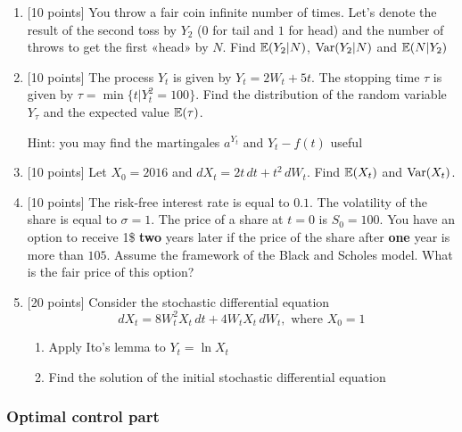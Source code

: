 \documentclass[12pt, a4paper]{article}
\begin{document}
\vspace{10pt}

\begin{enumerate}


\item $[$10 points] You throw a fair coin infinite number of times. 
Let's denote the result of the second toss by $Y_2$ ($0$ for tail and $1$ for head) and the number of throws to get the first «head» by $N$. 
Find $\mathbb{E}(Y_2|N)$, $\operatorname{Var}(Y_2|N)$ and $\mathbb{E}(N|Y_2)$

\item $[$10 points] The process $Y_t$ is given by $Y_t=2W_t+5t$. The stopping time $\tau$ is given by $\tau=\min\{t|Y_t^2=100\}$. Find the distribution of the random variable $Y_\tau$ and the expected value $\mathbb{E}(\tau)$.


Hint: you may find the martingales $a^{Y_t}$ and $Y_t-f(t)$ useful

\item $[$10 points] Let $X_0 = 2016$ and $dX_t = 2t \, dt + t^2 \, dW_t$. Find $\mathbb{E}(X_t)$ and $\operatorname{Var}(X_t)$.

\item $[$10 points] The risk-free interest rate is equal to $0.1$. The volatility of the share is equal to $\sigma=1$. The price of a share at $t=0$ is $S_0=100$. You have an option to receive 1\$ \textbf{two} years later if the price of the share after \textbf{one} year is more than $105$. Assume the framework of the Black and Scholes model. What is the fair price of this option?

\item $[$20 points] Consider the stochastic differential equation
\[
dX_t = 8W^2_t X_t \, dt + 4W_t X_t\, dW_t, \text{ where } X_0 = 1
\]

\begin{enumerate}
\item Apply Ito's lemma to $Y_t=\ln X_t$
\item Find the solution of the initial stochastic differential equation
\end{enumerate}

\end{enumerate}


\subsubsection*{Optimal control part}
\end{document}
